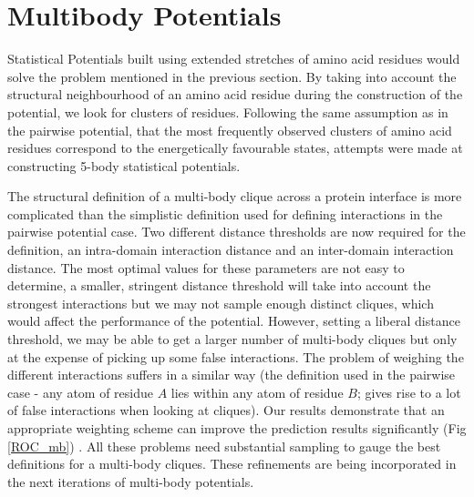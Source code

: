 \section{Multibody Potentials}
\par
Statistical Potentials built using extended stretches of amino acid residues would solve the problem mentioned in the previous section. By taking into account the structural neighbourhood of an amino acid residue during the construction of the potential, we look for clusters of residues. Following the same assumption as in the pairwise potential, that the most frequently observed clusters of amino acid residues correspond to the energetically favourable states, attempts were made at constructing 5-body statistical potentials.
\par
The structural definition of a multi-body clique across a protein interface is more complicated than the simplistic definition used for defining interactions in the pairwise potential case. Two different distance thresholds are now required for the definition, an intra-domain interaction distance and an inter-domain interaction distance. The most optimal values for these parameters are not easy to determine, a smaller, stringent distance threshold will take into account the strongest interactions but we may not sample enough distinct cliques, which would affect the performance of the potential. However, setting a liberal distance threshold, we may be able to get a larger number of multi-body cliques but only at the expense of picking up some false interactions. The problem of weighing the different interactions suffers in a similar way (the definition used in the pairwise case - any atom of residue $A$ lies within any atom of residue $B$; gives rise to a lot of false interactions when looking at cliques). Our results demonstrate that an appropriate weighting scheme can improve the prediction results significantly (Fig \ref{ROC_mb}) .  All these problems need substantial sampling to gauge the best definitions for a multi-body cliques. These refinements are being incorporated in the next iterations of multi-body potentials.

